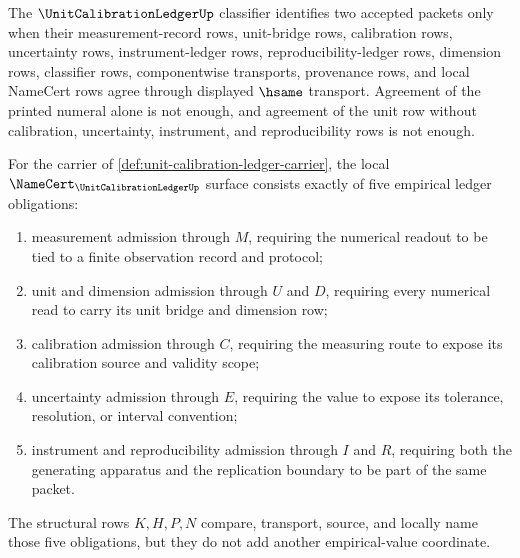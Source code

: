 \begin{definition}
\label{def:unit-calibration-ledger-classifier}
The $\UnitCalibrationLedgerUp$ classifier identifies two accepted packets only when their measurement-record rows, unit-bridge rows, calibration rows, uncertainty rows, instrument-ledger rows, reproducibility-ledger rows, dimension rows, classifier rows, componentwise transports, provenance rows, and local NameCert rows agree through displayed $\hsame$ transport. Agreement of the printed numeral alone is not enough, and agreement of the unit row without calibration, uncertainty, instrument, and reproducibility rows is not enough.
\end{definition}

\begin{theorem}
\label{thm:unit-calibration-ledger-namecert-obligations}
For the carrier of \autoref{def:unit-calibration-ledger-carrier}, the local $\NameCert_{\UnitCalibrationLedgerUp}$ surface consists exactly of five empirical ledger obligations:
\begin{enumerate}
\item measurement admission through $M$, requiring the numerical readout to be tied to a finite observation record and protocol;
\item unit and dimension admission through $U$ and $D$, requiring every numerical read to carry its unit bridge and dimension row;
\item calibration admission through $C$, requiring the measuring route to expose its calibration source and validity scope;
\item uncertainty admission through $E$, requiring the value to expose its tolerance, resolution, or interval convention;
\item instrument and reproducibility admission through $I$ and $R$, requiring both the generating apparatus and the replication boundary to be part of the same packet.
\end{enumerate}
The structural rows $K,H,P,N$ compare, transport, source, and locally name those five obligations, but they do not add another empirical-value coordinate.
\end{theorem}
